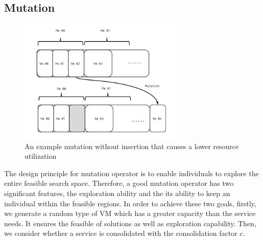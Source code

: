 \subsection{Mutation}
\begin{figure}
\centering
  \includegraphics[width=0.7\textwidth]{pics/preliminary/hollow.png}
  \caption{An example mutation without insertion that causes a lower resource utilization}
  \label{fig:hollow}
\end{figure}

The design principle for mutation operator is to enable individuals to explore the entire feasible search space.
Therefore, a good mutation operator has two significant features, the exploration ability and the its ability to keep an individual within the feasible regions. In order to achieve these two goals, firstly, we generate a random type of VM which has a greater capacity than the service needs. It ensures the feasible of solutions as well as exploration capability. Then, we consider whether a service is consolidated with the consolidation factor $c$. 

